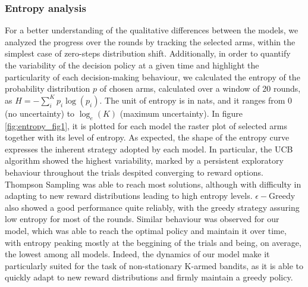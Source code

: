 \subsubsection{Entropy analysis}\label{sec:entropy}
\noindent For a better understanding of the qualitative differences between the models, we analyzed the progress over the rounds by tracking the selected arms, within the simplest case of zero-steps distribution shift.
Additionally, in order to quantify the variability of the decision policy at a given time and highlight the particularity of each decision-making behaviour, we calculated the entropy of the probability distribution $p$ of chosen arms, calculated over a window of 20 rounds, as $H=-\sum^{K}_{i} p_{i}\log(p_{i})$.
The unit of entropy is in nats, and it ranges from $0$ (no uncertainty) to $\log_{e}(K)$ (maximum uncertainty).
In figure \ref{fig:entropy_fig1}, it is plotted for each model the raster plot of selected arms together with its level of entropy. As expected, the shape of the entropy curve expresses the inherent strategy adopted by each model.
In particular, the UCB algorithm showed the highest variability, marked by a persistent exploratory behaviour throughout the trials despited converging to reward options. Thompson Sampling was able to reach most solutions, although with difficulty in adapting to new reward distributions
leading to high entropy levels.
$\epsilon-$Greedy also showed a good performance quite reliably, with the greedy strategy assuring low entropy for most of the rounds.
Similar behaviour was observed for our model, which was able to reach the optimal policy and maintain it over time, with entropy peaking mostly at the beggining of the trials and being, on average, the lowest among all models.
Indeed, the dynamics of our model make it particularly suited for the task of non-stationary K-armed bandits, as it is able to quickly adapt to new reward distributions and firmly maintain a greedy policy.

